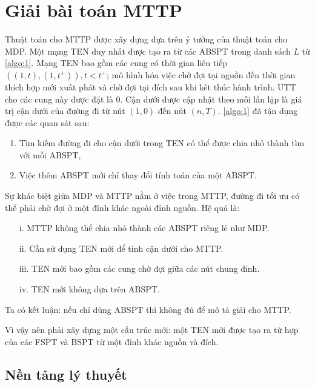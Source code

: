 \documentclass[../main.tex]{subfiles}
\begin{document}
\chapter{Giải bài toán MTTP}\label{giux1ea3i-buxe0i-touxe1n-mttp}

Thuật toán cho MTTP được xây dựng dựa trên ý tưởng của thuật toán cho
MDP. Một mạng TEN duy nhất được tạo ra từ các ABSPT trong danh sách
\(L\) từ \autoref{algo:1}. Mạng TEN bao gồm các cung có thời gian
liên tiếp \(((1, t), (1, t^+)), t<t^+\); mô hình hóa việc chờ đợi tại
nguồn đến thời gian thích hợp mới xuất phát và chờ đợi tại đích sau khi
kết thúc hành trình. UTT cho các cung này được đặt là 0. Cận dưới được
cập nhật theo mỗi lần lặp là giá trị cận dưới của đường đi từ nút
\((1,0)\) đến nút \((n, T)\). \autoref{algo:1} đã tận dụng được các quan sát
sau:

\begin{enumerate}
\def\labelenumi{\arabic{enumi}.}
\tightlist
\item
  Tìm kiếm đường đi cho cận dưới trong TEN có thể được chia nhỏ thành
  tìm với mỗi ABSPT,
\item
  Việc thêm ABSPT mới chỉ thay đổi tính toán của một ABSPT.
\end{enumerate}

Sự khác biệt giữa MDP và MTTP nằm ở việc trong MTTP, đường đi tối ưu có
thể phải chờ đợi ở một đỉnh khác ngoài đỉnh nguồn. Hệ quả là:

\begin{itemize}
\tightlist
\item[i.]
  MTTP không thể chia nhỏ thành các ABSPT riêng lẻ như MDP.
\item[ii.]
  Cần sử dụng TEN mới để tính cận dưới cho MTTP.
\item[iii.]
  TEN mới bao gồm các cung chờ đợi giữa các nút chung đỉnh.
\item[iv.]
  TEN mới không dựa trên ABSPT.
\end{itemize}

Ta có kết luận: nếu chỉ dùng ABSPT thì không đủ để mô tả giải cho MTTP.

Vì vậy nên phải xây dựng một cấu trúc mới: một TEN mới được tạo ra từ
hợp của các FSPT và BSPT từ một đỉnh khác nguồn và đích. 

\section{Nền tảng lý thuyết}\label{nux1ec1n-tux1ea3ng-luxfd-thuyux1ebft}
\end{document}
